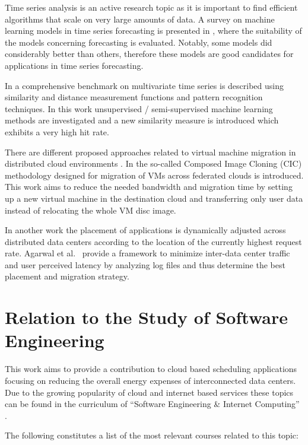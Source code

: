\documentclass[a4paper]{article}
\begin{document}
Time series analysis is an active research topic as it is important to find efficient algorithms that scale on very large amounts of data. A survey on machine learning models in time series forecasting is presented in \cite{ahmed2010empirical}, where the suitability of the models concerning forecasting is evaluated. Notably, some models did considerably better than others, therefore these models are good candidates for applications in time series forecasting. 

In \cite{lin2011pattern} a comprehensive benchmark on multivariate time series is described using similarity and distance measurement functions and pattern recognition techniques. In this work unsupervised / semi-supervised machine learning methods are investigated and a new similarity measure is introduced which exhibits a very high hit rate. 

There are different proposed approaches related to virtual machine migration in distributed cloud environments \cite{celesti2010improving, malet2010resource}. In \cite{celesti2010improving} the so-called Composed Image Cloning (CIC) methodology designed for migration of VMs across federated clouds is introduced. This work aims to reduce the needed bandwidth and migration time by setting up a new virtual machine in the destination cloud and transferring only user data instead of relocating the whole VM disc image. 

In another work \cite{malet2010resource} the placement of applications is dynamically adjusted across distributed data centers according to the location of the currently highest request rate. Agarwal et al.~\cite{agarwal2010volley} provide a framework to minimize inter-data center traffic and user perceived latency by analyzing log files and thus determine the best placement and migration strategy. 


\section{Relation to the Study of Software Engineering}

This work aims to provide a contribution to cloud based scheduling applications focusing on reducing the overall energy expenses of interconnected data centers. Due to the growing popularity of cloud and internet based services these topics can be found in the curriculum of ``Software Engineering \& Internet Computing'' \cite{curriculum2013curriculum}. 

The following constitutes a list of the most relevant courses related to this topic:
\end{document}
